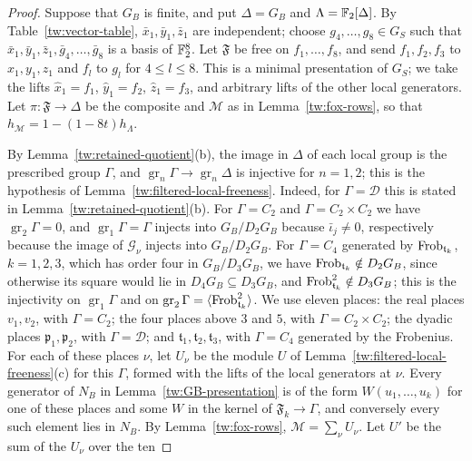\begin{proof}
Suppose that $G_B$ is finite, and put $\Delta=G_B$ and
$\Lambda=\mathbb F_2[\Delta]$. By Table~\ref{tw:vector-table},
$\bar x_1,\bar y_1,\bar z_1$ are independent; choose
$g_4,\dots,g_8\in G_S$ such that
$\bar x_1,\bar y_1,\bar z_1,\bar g_4,\dots,\bar g_8$ is a basis of
$\mathbb F_2^8$. Let $\mathfrak F$ be free on $f_1,\dots,f_8$, and send
$f_1,f_2,f_3$ to $x_1,y_1,z_1$ and $f_l$ to $g_l$ for $4\le l\le8$. This is a
minimal presentation of
$G_S$; we take the lifts $\hat x_1=f_1$, $\hat y_1=f_2$,
$\hat z_1=f_3$, and arbitrary lifts of the other local generators. Let
$\pi\colon\mathfrak F\to\Delta$ be the composite and $\mathcal M$ as in
Lemma~\ref{tw:fox-rows}, so that $h_{\mathcal M}=1-(1-8t)h_\Lambda$.

By Lemma~\ref{tw:retained-quotient}(b), the image in $\Delta$ of each
local group is the prescribed group $\Gamma$, and
$\operatorname{gr}_n\Gamma\to\operatorname{gr}_n\Delta$ is injective for
$n=1,2$; this is the hypothesis of
Lemma~\ref{tw:filtered-local-freeness}. Indeed, for $\Gamma=\mathcal D$ this is stated
in Lemma~\ref{tw:retained-quotient}(b). For $\Gamma=C_2$ and
$\Gamma=C_2\times C_2$ we have $\operatorname{gr}_2\Gamma=0$, and
$\operatorname{gr}_1\Gamma=\Gamma$ injects into $G_B/D_2G_B$ because
$\bar\iota_j\ne0$, respectively because the image of $\mathcal G_\nu$ injects
into $G_B/D_2G_B$. For $\Gamma=C_4$ generated by $\operatorname{Frob}_{\mathfrak t_k}$, $k=1,2,3$,
which has order four in $G_B/D_3G_B$, we have
$\operatorname{Frob}_{\mathfrak t_k}\notin D_2G_B$, since otherwise its square would lie in
$D_4G_B\subseteq D_3G_B$, and $\operatorname{Frob}_{\mathfrak t_k}^2\notin D_3G_B$; this is
the injectivity on $\operatorname{gr}_1\Gamma$ and on
$\operatorname{gr}_2\Gamma=\langle\operatorname{Frob}_{\mathfrak t_k}^2\rangle$. We use
eleven places: the real
places $v_1,v_2$, with $\Gamma=C_2$; the four places above $3$ and $5$, with
$\Gamma=C_2\times C_2$; the dyadic places $\mathfrak p_1,\mathfrak p_2$, with
$\Gamma=\mathcal D$; and $\mathfrak t_1,\mathfrak t_2,\mathfrak t_3$, with $\Gamma=C_4$
generated by the Frobenius. For each of these places $\nu$, let $U_\nu$ be
the module $U$ of Lemma~\ref{tw:filtered-local-freeness}(c) for this $\Gamma$,
formed with the lifts of the local generators at $\nu$. Every generator of
$N_B$ in Lemma~\ref{tw:GB-presentation} is of the form $W(u_1,\dots,u_k)$ for
one of these places and some $W$ in the kernel of $\mathfrak F_k\to\Gamma$, and
conversely every such element lies in $N_B$. By Lemma~\ref{tw:fox-rows},
$\mathcal M=\sum_\nu U_\nu$. Let $U'$ be the sum of the $U_\nu$ over the ten

\end{proof}
